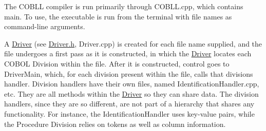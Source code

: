 The COBLL compiler is run primarily through {\ttfamily COBLL.\+cpp}, which contains {\ttfamily main}. To use, the executable is run from the terminal with file names as command-\/line arguments.

A \mbox{\hyperlink{class_driver}{Driver}} (see {\ttfamily \mbox{\hyperlink{_driver_8h_source}{Driver.\+h}}}, {\ttfamily Driver.\+cpp}) is created for each file name supplied, and the file undergoes a first pass as it is constructed, in which the \mbox{\hyperlink{class_driver}{Driver}} locates each COBOL Division within the file. After it is constructed, control goes to {\ttfamily Driver\+Main}, which, for each division present within the file, calls that division\textquotesingle{}s handler. Division handlers have their own files, named {\ttfamily Identification\+Handler.\+cpp}, etc. They are all methods within the \mbox{\hyperlink{class_driver}{Driver}} so they can share data. The division handlers, since they are so different, are not part of a hierarchy that shares any functionality. For instance, the Identification\+Handler uses key-\/value pairs, while the Procedure Division relies on tokens as well as column information. 